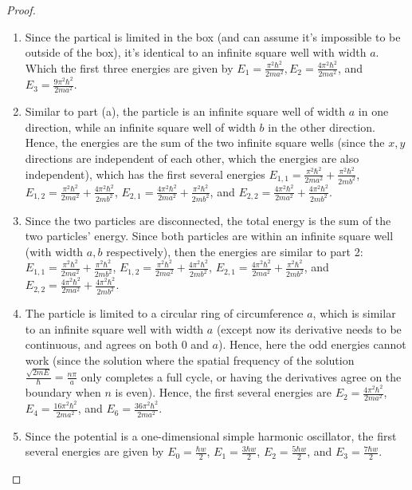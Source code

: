 \documentclass{article}
\begin{document}
\begin{proof}

    \hfil

    \begin{enumerate}
        \item Since the partical is limited in the box (and can assume it's impossible to be outside of the box), it's identical to an infinite square well with width $a$. Which the first three energies are given by $E_1 = \frac{\pi^2\hbar^2}{2ma^2}, E_2 = \frac{4\pi^2\hbar^2}{2ma^2}$, and $E_3 = \frac{9\pi^2\hbar^2}{2ma^2}$.
        \item Similar to part (a), the particle is an infinite square well of width $a$ in one direction, while an infinite square well of width $b$ in the other direction. Hence, the energies are the sum of the two infinite square wells (since the $x,y$ directions are independent of each other, which the energies are also independent), which has the first several energies $E_{1,1} = \frac{\pi^2\hbar^2}{2ma^2}+\frac{\pi^2\hbar^2}{2mb^2}$, $E_{1,2} = \frac{\pi^2\hbar^2}{2ma^2}+\frac{4\pi^2\hbar^2}{2mb^2}$, $E_{2,1}=\frac{4\pi^2\hbar^2}{2ma^2}+\frac{\pi^2\hbar^2}{2mb^2}$, and $E_{2,2} = \frac{4\pi^2\hbar^2}{2ma^2}+\frac{4\pi^2\hbar^2}{2mb^2}$.
        \item Since the two particles are disconnected, the total energy is the sum of the two particles' energy. Since both particles are within an infinite square well (with width $a,b$ respectively), then the energies are similar to part 2: $E_{1,1} = \frac{\pi^2\hbar^2}{2ma^2}+\frac{\pi^2\hbar^2}{2mb^2}$, $E_{1,2} = \frac{\pi^2\hbar^2}{2ma^2}+\frac{4\pi^2\hbar^2}{2mb^2}$, $E_{2,1}=\frac{4\pi^2\hbar^2}{2ma^2}+\frac{\pi^2\hbar^2}{2mb^2}$, and $E_{2,2} = \frac{4\pi^2\hbar^2}{2ma^2}+\frac{4\pi^2\hbar^2}{2mb^2}$.
        \item The particle is limited to a circular ring of circumference $a$, which is similar to an infinite square well with width $a$ (except now its derivative needs to be continuous, and agrees on both $0$ and $a$). Hence, here the odd energies cannot work (since the solution where the spatial frequency of the solution $\frac{\sqrt{2mE}}{\hbar} = \frac{n\pi}{a}$ only completes a full cycle, or having the derivatives agree on the boundary when $n$ is even). Hence, the first several energies are $E_2 = \frac{4\pi^2\hbar^2}{2ma^2}$, $E_4 = \frac{16\pi^2\hbar^2}{2ma^2}$, and $E_6 = \frac{36\pi^2\hbar^2}{2ma^2}$.
        \item Since the potential is a one-dimensional simple harmonic oscillator, the first several energies are given by $E_0 = \frac{\hbar w}{2}$, $E_1 = \frac{3\hbar w}{2}$, $E_2 = \frac{5\hbar w}{2}$, and $E_3 = \frac{7\hbar w}{2}$.

\end{enumerate}
\end{proof}
\end{document}
